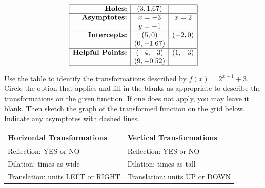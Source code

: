 \documentclass[11pt]{exam}
\begin{document}
\begin{questions}
\begin{center}
\renewcommand{\arraystretch}{2}
\[\begin{array}{|r|c|c|} \hline \textbf{Holes:} & (3, 1.67) & \\ \hline \textbf{Asymptotes:} & x = -3 & x = 2 \\ & y = -1 & \\ \hline \textbf{Intercepts:} & (5, 0) & (-2, 0) \\ & (0, -1.67) & \\ \hline \textbf{Helpful Points:} & (-4, -3) & (1, -3) \\ & (9, -0.52) & \\ \hline \end{array}\]

\vspace{12pt}

\end{center}
\newpage

\question [3] Use the table to identify the transformations described by \(\displaystyle{ f(x) = 2^{x - 1} + 3 }\). Circle the option that applies and fill in the blanks as appropriate to describe the transformations on the given function. If one does not apply, you may leave it blank. Then sketch the graph of the transformed function on the grid below. Indicate any asymptotes with dashed lines.\\
	\renewcommand{\arraystretch}{3} %
	\begin{center}
	\begin{tabular}{|l|l|}
		\hline
		\textbf{Horizontal Transformations}               & \textbf{Vertical Transformations}              \\ \hline
		Reflection: YES    or     NO       & Reflection:       YES    or     NO    \\ \hline
		Dilation: \underline{\hspace{2cm}} times as wide           & Dilation: \underline{\hspace{2cm}} times as tall        \\ \hline
		Translation: \underline{\hspace{2cm}} units LEFT or RIGHT & Translation: \underline{\hspace{2cm}} units UP or DOWN \\ \hline
	\end{tabular}
\end{center}
\vspace{12pt}


\end{questions}
\end{document}

